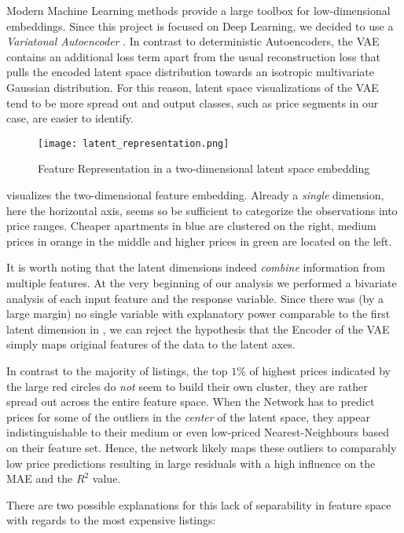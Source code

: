 Modern Machine Learning methods provide a large toolbox for low-dimensional embeddings.
Since this project is focused on Deep Learning, we decided to use a \emph{Variatonal Autoencoder} \citep{kingma2014}.
In contrast to deterministic Autoencoders, the VAE contains an additional loss term apart from the usual reconstruction loss that pulls the encoded latent space distribution towards an isotropic multivariate Gaussian distribution.
For this reason, latent space visualizations of the VAE tend to be more spread out and output classes, such as price segments in our case, are easier to identify.

\begin{figure}[t]
  \centering
  \texttt{[image: latent\_representation.png]}
  \caption{Feature Representation in a two-dimensional latent space embedding}
  \label{fig:latent-representation}
\end{figure}

 visualizes the two-dimensional feature embedding.
Already a \emph{single} dimension, here the horizontal axis, seems so be sufficient to categorize the observations into price ranges.
Cheaper apartments in blue are clustered on the right, medium prices in orange in the middle and higher prices in green are located on the left.

It is worth noting that the latent dimensions indeed \emph{combine} information from multiple features.
At the very beginning of our analysis we performed a bivariate analysis of each input feature and the response variable.
Since there was (by a large margin) no single variable with explanatory power comparable to the first latent dimension in , we can reject the hypothesis that the Encoder of the VAE simply maps original features of the data to the latent axes.

In contrast to the majority of listings, the top $1$\% of highest prices indicated by the large red circles do \emph{not} seem to build their own cluster, they are rather spread out across the entire feature space.
When the Network has to predict prices for some of the outliers in the \emph{center} of the latent space, they appear indistinguishable to their medium or even low-priced Nearest-Neighbours based on their feature set.
Hence, the network likely maps these outliers to comparably low price predictions resulting in large residuals with a high influence on the MAE and the $R^2$ value.

There are two possible explanations for this lack of separability in feature space with regards to the most expensive listings:

